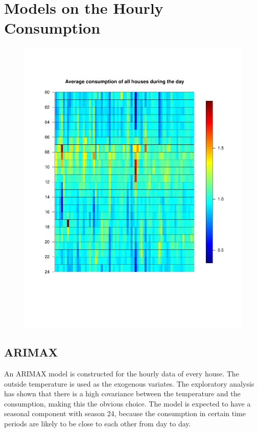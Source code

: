 \chapter{Models on the Hourly Consumption}






\begin{figure}
    \centering
    \includegraphics[width=.8\textwidth]{../../../figures/Heatmap.pdf}
    \caption{}
    \label{fig: daily_cons}
\end{figure}








\section{ARIMAX}
An ARIMAX model is constructed for the hourly data of every house. The outside temperature is used as the exogenous variates. The exploratory analysis has shown that there is a high covariance between the temperature and the consumption, making this the obvious choice. The model is expected to have a seasonal component with season 24, because the consumption in certain time periods are likely to be close to each other from day to day.

